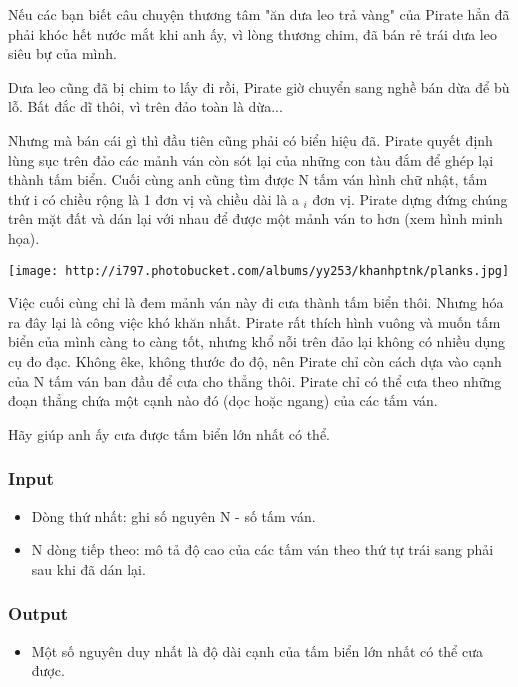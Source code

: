 



   Nếu các bạn biết câu chuyện thương tâm "ăn dưa leo trả vàng" của Pirate hẳn đã phải khóc hết nước mắt khi anh ấy, vì lòng thương chim, đã bán rẻ trái dưa leo siêu bự của mình.  

   Dưa leo cũng đã bị chim to lấy đi rồi, Pirate giờ chuyển sang nghề bán dừa để bù lỗ. Bất đắc dĩ thôi, vì trên đảo toàn là dừa...  

   Nhưng mà bán cái gì thì đầu tiên cũng phải có biển hiệu đã. Pirate quyết định lùng sục trên đảo các mảnh ván còn sót lại của những con tàu đắm để ghép lại thành tấm biển. Cuối cùng anh cũng tìm được N tấm ván hình chữ nhật, tấm thứ i có chiều rộng là 1 đơn vị và chiều dài là a   $_    i   $   đơn vị. Pirate dựng đứng chúng trên mặt đất và dán lại với nhau để được một mảnh ván to hơn (xem hình minh họa).  


\texttt{[image: http://i797.photobucket.com/albums/yy253/khanhptnk/planks.jpg]}

   Việc cuối cùng chỉ là đem mảnh ván này đi cưa thành tấm biển thôi. Nhưng hóa ra đây lại là công việc khó khăn nhất. Pirate rất thích hình vuông và muốn tấm biển của mình càng to càng tốt, nhưng khổ nỗi trên đảo lại không có nhiều dụng cụ đo đạc. Không êke, không thước đo độ, nên Pirate chỉ còn cách dựa vào cạnh của N tấm ván ban đầu để cưa cho thẳng thôi. Pirate chỉ có thể cưa theo những đoạn thẳng chứa một cạnh nào đó (dọc hoặc ngang) của các tấm ván.  

   Hãy giúp anh ấy cưa được tấm biển lớn nhất có thể.  

\subsubsection{   Input  }
\begin{itemize}
	\item     Dòng thứ nhất: ghi số nguyên N - số tấm ván.   
	\item     N dòng tiếp theo: mô tả độ cao của các tấm ván theo thứ tự trái sang phải sau khi đã dán lại.   
\end{itemize}

\subsubsection{   Output  }
\begin{itemize}
	\item     Một số nguyên duy nhất là độ dài cạnh của tấm biển lớn nhất có thể cưa được.   
\end{itemize}

